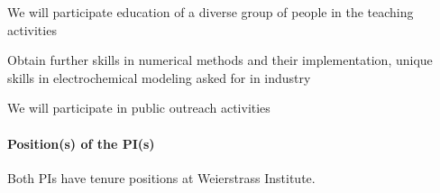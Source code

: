 \documentclass[a4paper,10pt]{article}
\begin{document}
We will participate education of a diverse group of people in the teaching activities

Obtain further skills in numerical methods and their implementation, unique skills in electrochemical
modeling asked for in  industry

We will participate in public outreach activities

\paragraph{Position(s) of the PI(s)}
Both PIs have tenure positions at Weierstrass Institute.
\end{document}
